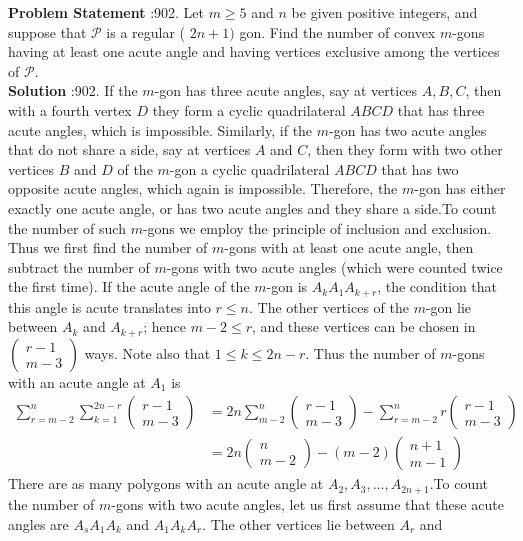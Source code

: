 \documentclass[10pt]{article}
\begin{document}
\textbf{Problem Statement} :902. Let $m \geq 5$ and $n$ be given positive integers, and suppose that $\mathcal{P}$ is a regular ( $2 n+1)$ gon. Find the number of convex $m$-gons having at least one acute angle and having vertices exclusive among the vertices of $\mathcal{P}$.\\
\textbf{Solution} :902. If the $m$-gon has three acute angles, say at vertices $A, B, C$, then with a fourth vertex $D$ they form a cyclic quadrilateral $A B C D$ that has three acute angles, which is impossible. Similarly, if the $m$-gon has two acute angles that do not share a side, say at vertices $A$ and $C$, then they form with two other vertices $B$ and $D$ of the $m$-gon a cyclic quadrilateral $A B C D$ that has two opposite acute angles, which again is impossible. Therefore, the $m$-gon has either exactly one acute angle, or has two acute angles and they share a side.To count the number of such $m$-gons we employ the principle of inclusion and exclusion. Thus we first find the number of $m$-gons with at least one acute angle, then subtract the number of $m$-gons with two acute angles (which were counted twice the first time). If the acute angle of the $m$-gon is $A_{k} A_{1} A_{k+r}$, the condition that this angle is acute translates into $r \leq n$. The other vertices of the $m$-gon lie between $A_{k}$ and $A_{k+r}$; hence $m-2 \leq r$, and these vertices can be chosen in $\left(\begin{array}{c}r-1 \\ m-3\end{array}\right)$ ways. Note also that $1 \leq k \leq 2 n-r$. Thus the number of $m$-gons with an acute angle at $A_{1}$ is$$ \begin{aligned} \sum_{r=m-2}^{n} \sum_{k=1}^{2 n-r}\left(\begin{array}{c} r-1 \\ m-3 \end{array}\right) &=2 n \sum_{m-2}^{n}\left(\begin{array}{c} r-1 \\ m-3 \end{array}\right)-\sum_{r=m-2}^{n} r\left(\begin{array}{c} r-1 \\ m-3 \end{array}\right) \\ &=2 n\left(\begin{array}{c} n \\ m-2 \end{array}\right)-(m-2)\left(\begin{array}{c} n+1 \\ m-1 \end{array}\right) \end{aligned} $$There are as many polygons with an acute angle at $A_{2}, A_{3}, \ldots, A_{2 n+1}$.To count the number of $m$-gons with two acute angles, let us first assume that these acute angles are $A_{s} A_{1} A_{k}$ and $A_{1} A_{k} A_{r}$. The other vertices lie between $A_{r}$ and 
\end{document}
